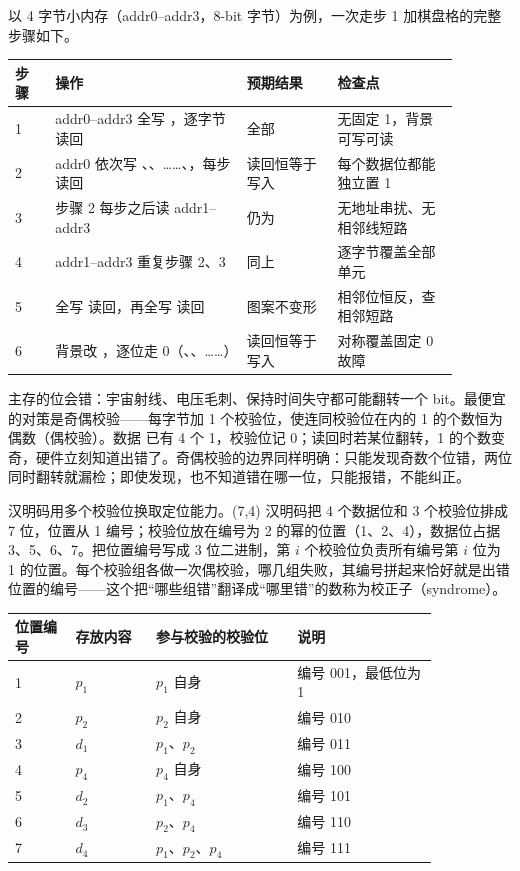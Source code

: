 以 4 字节小内存（addr0--addr3，8-bit 字节）为例，一次走步 1 加棋盘格的完整步骤如下。

\begin{longtable}{L{0.08\linewidth}L{0.38\linewidth}L{0.18\linewidth}L{0.24\linewidth}}
\toprule
步骤 & 操作 & 预期结果 & 检查点 \\
 & addr0--addr3 全写 ，逐字节读回 & 全部  & 无固定 1，背景可写可读 \\
2 & addr0 依次写 、、……、，每步读回 & 读回恒等于写入 & 每个数据位都能独立置 1 \\
3 & 步骤 2 每步之后读 addr1--addr3 & 仍为  & 无地址串扰、无相邻线短路 \\
4 & addr1--addr3 重复步骤 2、3 & 同上 & 逐字节覆盖全部单元 \\
5 & 全写  读回，再全写  读回 & 图案不变形 & 相邻位恒反，查相邻短路 \\
6 & 背景改 ，逐位走 0（、、……） & 读回恒等于写入 & 对称覆盖固定 0 故障 \\
\bottomrule
\end{longtable}

主存的位会错：宇宙射线、电压毛刺、保持时间失守都可能翻转一个 bit。最便宜的对策是奇偶校验——每字节加 1 个校验位，使连同校验位在内的 1 的个数恒为偶数（偶校验）。数据  已有 4 个 1，校验位记 0；读回时若某位翻转，1 的个数变奇，硬件立刻知道出错了。奇偶校验的边界同样明确：只能发现奇数个位错，两位同时翻转就漏检；即使发现，也不知道错在哪一位，只能报错，不能纠正。

汉明码用多个校验位换取定位能力。(7,4) 汉明码把 4 个数据位和 3 个校验位排成 7 位，位置从 1 编号；校验位放在编号为 2 的幂的位置（1、2、4），数据位占据 3、5、6、7。把位置编号写成 3 位二进制，第 $i$ 个校验位负责所有编号第 $i$ 位为 1 的位置。每个校验组各做一次偶校验，哪几组失败，其编号拼起来恰好就是出错位置的编号——这个把“哪些组错”翻译成“哪里错”的数称为校正子（syndrome）。

\begin{longtable}{L{0.12\linewidth}L{0.16\linewidth}L{0.28\linewidth}L{0.28\linewidth}}
\toprule
位置编号 & 存放内容 & 参与校验的校验位 & 说明 \\
 & $p_1$ & $p_1$ 自身 & 编号 001，最低位为 1 \\
2 & $p_2$ & $p_2$ 自身 & 编号 010 \\
3 & $d_1$ & $p_1$、$p_2$ & 编号 011 \\
4 & $p_4$ & $p_4$ 自身 & 编号 100 \\
5 & $d_2$ & $p_1$、$p_4$ & 编号 101 \\
6 & $d_3$ & $p_2$、$p_4$ & 编号 110 \\
7 & $d_4$ & $p_1$、$p_2$、$p_4$ & 编号 111 \\
\bottomrule
\end{longtable}

